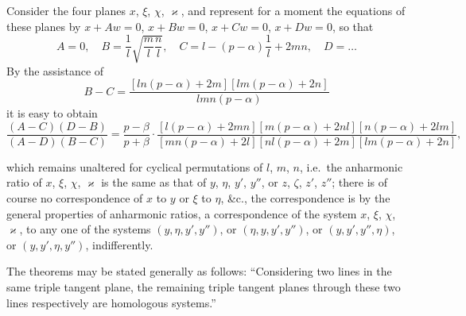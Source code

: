 \documentclass[11pt,a4paper]{article}
\theoremstyle{definition}
\begin{document}
Consider the four planes $x$, $\xi$, $\chi$, $\varkappa$, and represent for a moment the equations of these planes by $x + Aw = 0$, $x + Bw = 0$, $x + Cw = 0$, $x + Dw = 0$, so that
\[
A = 0, \quad B = \frac{1}{l}\sqrt{\frac{m}{l}\frac{n}{l}}, \quad C = l - (p - \alpha)\frac{1}{l} + 2mn, \quad D = \ldots
\]
By the assistance of
\[
B - C = \frac{[ln(p - \alpha) + 2m][lm(p - \alpha) + 2n]}{lmn(p - \alpha)}
\]
it is easy to obtain
\[
\frac{(A - C)(D - B)}{(A - D)(B - C)} = \frac{p - \beta}{p + \beta} \cdot \frac{[l(p - \alpha) + 2mn][m(p - \alpha) + 2nl][n(p - \alpha) + 2lm]}{[mn(p - \alpha) + 2l][nl(p - \alpha) + 2m][lm(p - \alpha) + 2n]},
\]

\newpage

\setcounter{page}{454}

which remains unaltered for cyclical permutations of $l$, $m$, $n$, i.e.\ the anharmonic ratio of $x$, $\xi$, $\chi$, $\varkappa$ is the same as that of $y$, $\eta$, $y'$, $y''$, or $z$, $\zeta$, $z'$, $z''$; there is of course no correspondence of $x$ to $y$ or $\xi$ to $\eta$, \&c., the correspondence is by the general properties of anharmonic ratios, a correspondence of the system $x$, $\xi$, $\chi$, $\varkappa$, to any one of the systems $(y, \eta, y', y'')$, or $(\eta, y, y', y'')$, or $(y, y', y'', \eta)$, or $(y, y', \eta, y'')$, indifferently.

The theorems may be stated generally as follows: ``Considering two lines in the same triple tangent plane, the remaining triple tangent planes through these two lines respectively are homologous systems.''
\end{document}
